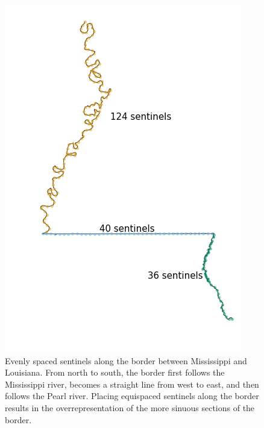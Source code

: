 \documentclass[letter,12pt]{article}
\begin{document}
\label{sec:invvar}



\begin{figure}[tbp]
    \centering
    \includegraphics[height=0.5\textheight]{../figures/mississippi_counts.png}
    \caption{\label{fig:mississippi_counts} 
        Evenly spaced sentinels along the border between Mississippi and Louisiana.
        From north to south, the border first follows the Mississippi river, becomes a straight line from west to east, and then follows the Pearl river.
        Placing equispaced sentinels along the border results in the overrepresentation of the more sinuous sections of the border.
    }
\end{figure}
\end{document}
